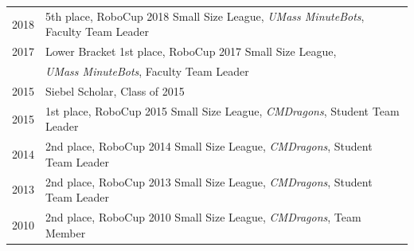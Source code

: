 \documentclass[Times]{article}
\begin{document}
\begin{longtable}{@{}p{1.2cm} >{\raggedright\arraybackslash}p{\dimexpr\textwidth-1.2cm-2\tabcolsep\relax}@{}}
  2018  & 5th place, RoboCup 2018 Small Size League,
      \emph{UMass MinuteBots}, Faculty Team Leader\\
  2017  & Lower Bracket 1st place, RoboCup 2017 Small Size League, \\
      &\emph{UMass MinuteBots}, Faculty Team Leader\\
  2015  & Siebel Scholar, Class of 2015 \\
  2015  & 1st place, RoboCup 2015 Small Size League,
     \emph{CMDragons}, Student Team Leader\\
  2014  & 2nd place, RoboCup 2014 Small Size League,
     \emph{CMDragons}, Student Team Leader\\
  2013  & 2nd place, RoboCup 2013 Small Size League,
     \emph{CMDragons}, Student Team Leader\\
  2010  & 2nd place, RoboCup 2010 Small Size League,
     \emph{CMDragons}, Team Member\\
\end{longtable}



%

\end{document}
